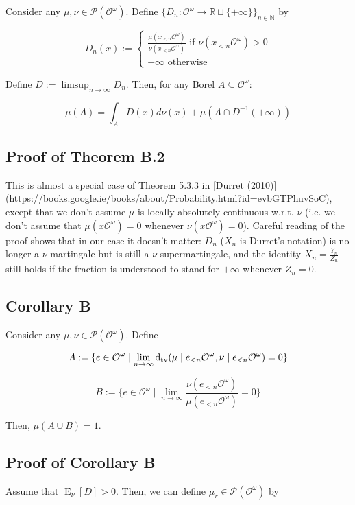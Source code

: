 \documentclass[a4paper]{article}
\DeclareMathOperator{\E}{E}
\newcommand{\Dtv}{\operatorname{d}_{\textnormal{tv}}}
\newcommand{\Nats}{\mathbb{N}}
\newcommand{\Reals}{\mathbb{R}}
\newcommand{\Prob}{\mathcal{P}}
\newcommand{\Obs}{\mathcal{O}}
\newcommand{\ObsO}{\Obs^\omega}
\begin{document}
Consider any ${\mu, \nu \in \Prob(\ObsO)}$. Define ${\{D_n: \ObsO \rightarrow \Reals \sqcup \{+\infty\}\}_{n \in \Nats}}$ by

$$D_n(x):=\begin{cases}\frac{\mu(x_{<n}\ObsO)}{\nu(x_{<n}\ObsO)} \text{ if } \nu(x_{<n}\ObsO) > 0\\+\infty \text{ otherwise}\end{cases}$$

Define ${D:= \limsup_{n \rightarrow \infty} D_n}$. Then, for any Borel ${A \subseteq \ObsO}$:

$$\mu(A) = \int_A D(x) d\nu(x) + \mu(A \cap D^{-1}(+\infty))$$

\subsection{Proof of Theorem B.2}

This is almost a special case of Theorem 5.3.3 in [Durret (2010)](https://books.google.ie/books/about/Probability.html?id=evbGTPhuvSoC), except that we don't assume ${\mu}$ is locally absolutely continuous w.r.t. ${\nu}$ (i.e. we don't assume that ${\mu(x\ObsO)=0}$ whenever ${\nu(x\ObsO)=0}$). Careful reading of the proof shows that in our case it doesn't matter: ${D_n}$ (${X_n}$ is Durret's notation) is no longer a ${\nu}$-martingale but is still a ${\nu}$-supermartingale, and the identity ${X_n = \frac{Y_n}{Z_n}}$ still holds if the fraction is understood to stand for ${+\infty}$ whenever ${Z_n = 0}$.

\subsection{Corollary B}

Consider any ${\mu, \nu \in \Prob(\ObsO)}$. Define

$$A:=\{e \in \ObsO \mid \lim_{n \rightarrow \infty} \Dtv(\mu \mid e_{<n}\ObsO, \nu \mid e_{<n}\ObsO) = 0\}$$

$$B:=\{e \in \ObsO \mid \lim_{n \rightarrow \infty} \frac{\nu(e_{<n}\ObsO)}{\mu(e_{<n}\ObsO)} = 0\}$$

Then, ${\mu(A \cup B) = 1}$.

\subsection{Proof of Corollary B}

Assume that ${\E_\nu[D] > 0}$. Then, we can define ${\mu_r \in \Prob(\ObsO)}$ by
\end{document}

